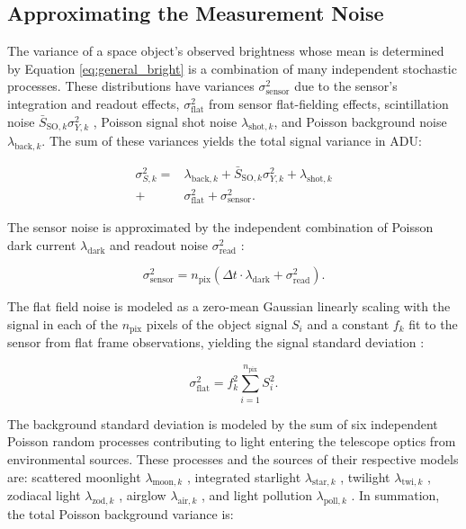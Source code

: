 \documentclass[a4paper,twocolumn]{spaceDebrisC} %
\begin{document}
\subsection{Approximating the Measurement Noise}

The variance of a space object's observed brightness whose mean is determined by Equation \ref{eq:general_bright} is a combination of many independent stochastic processes. These distributions have variances $\sigma^2_\text{sensor}$ due to the sensor's integration and readout effects, $\sigma^2_\text{flat}$ from sensor flat-fielding effects, scintillation noise $\bar{S}_{\text{SO},k} \sigma^2_{Y,k}$ \cite{osborn2015}, Poisson signal shot noise $\lambda_{\text{shot},k}$, and Poisson background noise $\lambda_{\text{back},k}$. The sum of these variances yields the total signal variance in ADU:

\begin{equation} \label{eq:sigma_total}
  \begin{split}
  \sigma^2_{S,k} = &\lambda_{\text{back},k} + \bar{S}_{\text{SO},k} \sigma^2_{Y,k} + \lambda_{\text{shot},k} \\ + &\sigma^2_\text{flat} + \sigma^2_\text{sensor}.
  \end{split}
\end{equation}

The sensor noise is approximated by the independent combination of Poisson dark current $\lambda_\text{dark}$ and readout noise $\sigma_\text{read}^2$ \cite{krag2003}:

\begin{equation} \label{eq:sensor_noise}
  \sigma_\text{sensor}^2 = n_\text{pix} \left( \Delta t \cdot \lambda_\text{dark} + \sigma_\text{read}^2 \right).
\end{equation}

The flat field noise is modeled as a zero-mean Gaussian linearly scaling with the signal in each of the $n_\text{pix}$ pixels of the object signal $S_i$ and a constant $f_k$ fit to the sensor from flat frame observations, yielding the signal standard deviation \cite{newberry1996}: 

\begin{equation}
  \sigma_\text{flat}^2 = f_k^2 \sum_{i=1}^{n_\text{pix}} S_i^2.
\end{equation}

The background standard deviation is modeled by the sum of six independent Poisson random processes contributing to light entering the telescope optics from environmental sources. These processes and the sources of their respective models are: scattered moonlight $\lambda_{\text{moon},k}$ \cite{daniels1977}, integrated starlight $\lambda_{\text{star},k}$ \cite{krag2003}, twilight $\lambda_{\text{twi},k}$ \cite{patat2006}, zodiacal light $\lambda_{\text{zod},k}$ \cite{roach1972}, airglow $\lambda_{\text{air},k}$ \cite{krag2003}, and light pollution $\lambda_{\text{poll},k}$ \cite{falchi2016, falchi2016_data}. In summation, the total Poisson background variance is:
\end{document}
